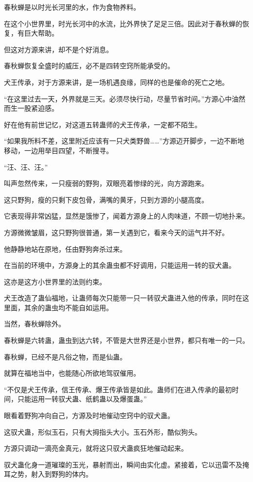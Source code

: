 \begin{this_body}
春秋蝉是以时光长河里的水，作为食物养料。

在这个小世界里，时光长河中的水流，比外界快了足足三倍。因此对于春秋蝉的恢复，有巨大帮助。

但这对方源来讲，却不是个好消息。

春秋蝉恢复全盛时的威压，必不是四转空窍所能承受的。

犬王传承，对于方源来讲，是一场机遇良缘，同样的也是催命的死亡之地。

“在这里过去一天，外界就是三天。必须尽快行动，尽量节省时间。”方源心中油然而生一股紧迫感。

好在他有前世记忆，对这道五转蛊师的犬王传承，一定都不陌生。

“如果我所料不差，这里附近应该有一只犬类野兽……”方源迈开脚步，一边不断地移动，一边用举目四望，不断搜寻。

“汪、汪、汪。”

叫声忽然传来，一只瘦弱的野狗，双眼亮着惨绿的光，向方源跑来。

这只野狗，瘦的只剩下皮包骨，满嘴的黄牙，只到方源的小腿高度。

它表现得非常凶猛，显然是饿惨了，闻着方源身上的人肉味道，不顾一切地扑来。

方源微微皱眉，这只野狗很普通，第一关遇到它，看来今天的运气并不好。

他静静地站在原地，任由野狗奔杀过来。

在当前的环境中，方源身上的其余蛊虫都不好调用，只能运用一转的驭犬蛊。

这亦是这方小世界里的法则约束。

犬王改造了蛊仙福地，让蛊师每次只能带一只一转驭犬蛊进入他的传承，同时在这里面，其余的蛊虫均不能自如运用。

当然，春秋蝉除外。

春秋蝉是六转蛊，蛊虫到达六转，不管是大世界还是小世界，都只有唯一的一只。

春秋蝉，已经不是凡俗之物，而是仙蛊。

就算在福地当中，也能随心所欲地驾驭催用。

“不仅是犬王传承，信王传承、爆王传承皆是如此。蛊师们在进入传承的最初时间，只能运用一转驭犬蛊、纸鹤蛊以及爆蛋蛊。”

眼看着野狗冲向自己，方源及时地催动空窍中的驭犬蛊。

这驭犬蛊，形似玉石，只有大拇指头大小。玉石外形，酷似狗头。

方源只调动一滴亮金真元，就将这只驭犬蛊疯狂地催动起来。

驭犬蛊化身一道璀璨的玉光，暴射而出，瞬间由实化虚。紧接着，它以迅雷不及掩耳之势，射入到野狗的体内。


\end{this_body}
